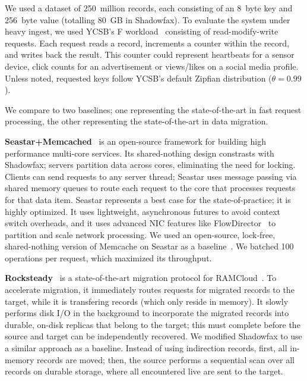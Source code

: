 We used a dataset of 250~million records, each consisting of
an 8~byte key and 256~byte value (totalling 80~GB in Shadowfax).
%
To evaluate the system under heavy ingest, we used YCSB's F
workload~\cite{ycsb} consisting of read-modify-write requests.
%
Each request reads a record, increments a counter within the record, and
writes back the result.
%
This counter could represent heartbeats for a sensor device, click
counts for an advertisement or views/likes on a social media profile.
%
Unless noted, requested keys follow YCSB's default Zipfian distribution ($\theta = 0.99$).

We compare to two baselines; one representing the
state-of-the-art in fast request processing, the other representing the
state-of-the-art in data migration.

\noindent
\textbf{Seastar+Memcached}~\cite{seastar}
is an open-source framework for building high
performance multi-core services.
%
Its shared-nothing design constrasts with Shadowfax;
servers partition data across cores, eliminating the need for locking.
%
Clients can send requests to any server thread;
Seastar uses message passing via shared memory queues to route
each request to the core that processes requests for that data item.
%
Seastar represents a best case for the state-of-practice; it is highly optimized.
%
It uses lightweight, asynchronous futures to avoid
context switch overheads, and it uses advanced NIC features like
FlowDirector~\cite{flow-director} to partition and scale network processing.
%
We used an open-source, lock-free, shared-nothing version of
Memcache on Seastar as a baseline~\cite{seastar-apps}.
%
We batched 100 operations per request, which maximized its throughput.

\noindent
\textbf{Rocksteady}~\cite{rocksteady} is a state-of-the-art migration
protocol for RAMCloud~\cite{ramcloud}.
%
To accelerate migration, it immediately routes requests for migrated records
to the target, while it is transfering records (which only reside in memory).
%
It slowly performs disk I/O in the background to incorporate the migrated records
into durable, on-disk replicas that belong to the target; this must complete
before the source and target can be independently recovered.
%
%
We modified Shadowfax to use a similar approach as a baseline.
%
Instead of using indirection records, first, all in-memory records are moved;
then, the source performs a sequential scan over all records on durable
storage, where all encountered live are sent to the target.
%
%

